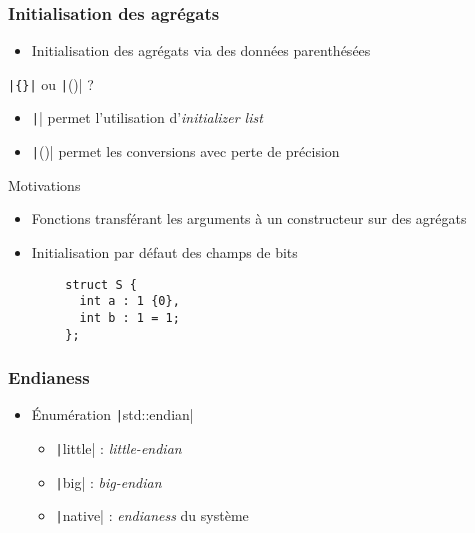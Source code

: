 \documentclass[C++.tex]{subfiles}
\begin{document}
\begin{frame}[fragile]
	\frametitle{Initialisation des agrégats}
	\begin{itemize}
		\item Initialisation des agrégats via des données parenthésées
	\end{itemize}

	\begin{block}{\texttt{|\{\}|} ou \texttt|()| ?}
		\begin{itemize}
			\item \texttt|{}| permet l'utilisation d'\textit{initializer list}
			\item \texttt|()| permet les conversions avec perte de précision
		\end{itemize}
	\end{block}

	\begin{block}{Motivations}
		\begin{itemize}
			\item Fonctions transférant les arguments à un constructeur sur des agrégats
		\end{itemize}
	\end{block}


	\begin{itemize}
		\item Initialisation par défaut des champs de bits
	\end{itemize}

	\begin{verbatim}
		struct S {
		  int a : 1 {0},
		  int b : 1 = 1;
		};
	\end{verbatim}

\end{frame}

\begin{frame}[fragile]
	\frametitle{Endianess}
	\begin{itemize}
		\item Énumération \texttt|std::endian|
		\begin{itemize}
			\item \texttt|little| : \textit{little-endian}
			\item \texttt|big| : \textit{big-endian}
			\item \texttt|native| : \textit{endianess} du système
		\end{itemize}
	\end{itemize}
\end{frame}
\end{document}
